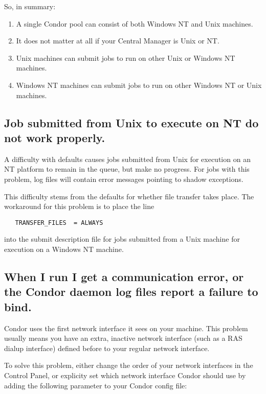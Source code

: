 So, in summary:

\begin{enumerate}

\item{A single Condor pool can consist of both Windows NT and Unix
machines.}

\item{It does not matter at all if your Central Manager is Unix or NT.}

\item{Unix machines can submit jobs to run on other Unix or Windows NT
machines.}

\item{Windows NT machines can submit jobs to run on other Windows
NT or Unix machines.}

\end{enumerate}


\subsection{Job submitted from Unix to execute on NT do not work properly.}
A difficulty with defaults causes jobs submitted from Unix for execution
on an NT platform to remain in the queue, but make no progress.
For jobs with this problem, log files will contain error messages
pointing to shadow exceptions.

This difficulty stems from the defaults for whether file transfer
takes place.
The workaround for this problem is to place the line
\begin{verbatim}
   TRANSFER_FILES  = ALWAYS
\end{verbatim}
into the submit description file for jobs submitted from a Unix
machine for execution on a Windows NT machine.


\subsection{When I run  I get a communication error, or the
Condor daemon log files report a failure to bind.}

Condor uses the first network interface it sees on your machine.
This problem usually means you have an extra, inactive network
interface (such as a RAS dialup interface) defined before to your
regular network interface.

To solve this problem, either change the order of your network
interfaces in the Control Panel, or explicity set which network
interface Condor should use by adding the following parameter to your
Condor config file:

